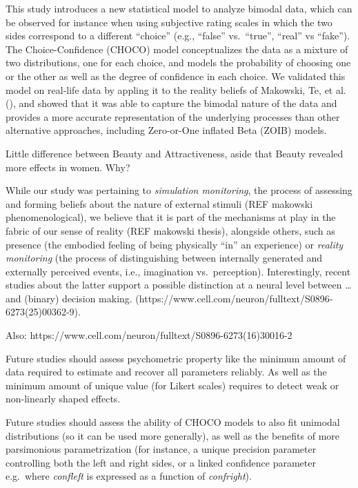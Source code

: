 \documentclass[
  jou,
  floatsintext,
  longtable,
  nolmodern,
  notxfonts,
  notimes,
  colorlinks=true,linkcolor=blue,citecolor=blue,urlcolor=blue]{apa7}
\begin{document}
This study introduces a new statistical model to analyze bimodal data,
which can be observed for instance when using subjective rating scales
in which the two sides correspond to a different ``choice'' (e.g.,
``false'' vs.~``true'', ``real'' vs ``fake''). The Choice-Confidence
(CHOCO) model conceptualizes the data as a mixture of two distributions,
one for each choice, and models the probability of choosing one or the
other as well as the degree of confidence in each choice. We validated
this model on real-life data by appling it to the reality beliefs of
Makowski, Te, et al. (), and showed
that it was able to capture the bimodal nature of the data and provides
a more accurate representation of the underlying processes than other
alternative approaches, including Zero-or-One inflated Beta (ZOIB)
models.

Little difference between Beauty and Attractiveness, aside that Beauty
revealed more effects in women. Why?

While our study was pertaining to \emph{simulation monitoring}, the
process of assessing and forming beliefs about the nature of external
stimuli (REF makowski phenomenological), we believe that it is part of
the mechanisms at play in the fabric of our sense of reality (REF
makowski thesis), alongside others, such as presence (the embodied
feeling of being physically ``in'' an experience) or \emph{reality
monitoring} (the process of distinguishing between internally generated
and externally perceived events, i.e., imagination vs.~perception).
Interestingly, recent studies about the latter support a possible
distinction at a neural level between \ldots{} and (binary) decision
making. (https://www.cell.com/neuron/fulltext/S0896-6273(25)00362-9).

Also: https://www.cell.com/neuron/fulltext/S0896-6273(16)30016-2

Future studies should assess psychometric property like the minimum
amount of data required to estimate and recover all parameters reliably.
As well as the minimum amount of unique value (for Likert scales)
requires to detect weak or non-linearly shaped effects.

Future studies should assess the ability of CHOCO models to also fit
unimodal distributions (so it can be used more generally), as well as
the benefits of more parsimonious parametrization (for instance, a
unique precision parameter controlling both the left and right sides, or
a linked confidence parameter e.g.~where \emph{confleft} is expressed as
a function of \emph{confright}).
\end{document}
